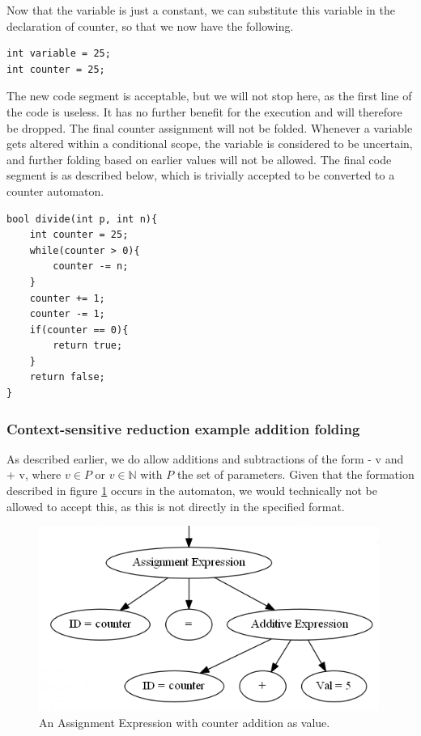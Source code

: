 \documentclass[12pt]{article}
\begin{document}
Now that the variable is just a constant, we can substitute this variable in the declaration of counter, so that we now have the following.
\begin{lstlisting}[style=CStyle]
int variable = 25;
int counter = 25;
\end{lstlisting}

The new code segment is acceptable, but we will not stop here, as the first line of the code is useless. It has no further benefit for the execution and will therefore be dropped. The final counter assignment will not be folded. Whenever a variable gets altered within a conditional scope, the variable is considered to be uncertain, and further folding based on earlier values will not be allowed. The final code segment is as described below, which is trivially accepted to be converted to a counter automaton.

\begin{lstlisting}[style=CStyle]
bool divide(int p, int n){
	int counter = 25;
	while(counter > 0){
		counter -= n;
	}
	counter += 1;
	counter -= 1;
	if(counter == 0){
		return true;
	}
	return false;
}
\end{lstlisting}

\subsubsection{Context-sensitive reduction example addition folding}
As described earlier, we do allow additions and subtractions of the form - v and + v, where $v \in P$ or $v \in \mathbb{N}$ with $P$ the set of parameters. Given that the formation described in figure \ref{fig:unfolded_addition} occurs in the automaton, we would technically not be allowed to accept this, as this is not directly in the specified format.

\begin{figure}[h]
	\centering
	\includegraphics[width=0.8\linewidth]{unfolded_addition}
	\caption{An Assignment Expression with counter addition as value.}
	\label{fig:unfolded_addition}
\end{figure}
\end{document}
